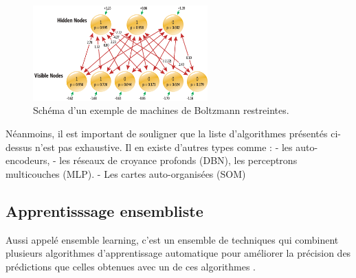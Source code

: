 \begin{itemize}[label=$\bullet$]
    \begin{figure}[htbp]
    \centering
    \includegraphics[width=0.6\textwidth,height=0.2\textheight]{img/RBM.png}
    \caption{Schéma d'un exemple de machines de Boltzmann restreintes.
    \cite{RBM}}
    \label{fig:example18}
    \end{figure}

Néanmoins, il est important de souligner que la liste d'algorithmes présentés ci-dessus n'est pas exhaustive. Il en existe d'autres types comme :
- les auto-encodeurs,
- les réseaux de croyance profonds (DBN),
les perceptrons multicouches (MLP).
- Les cartes auto-organisées (SOM) 
\end{itemize}


     
\subsection{Apprentisssage ensembliste}
Aussi appelé ensemble learning, c'est un ensemble de techniques qui combinent plusieurs algorithmes d’apprentissage automatique pour améliorer la précision des prédictions que celles obtenues avec un de ces algorithmes .

